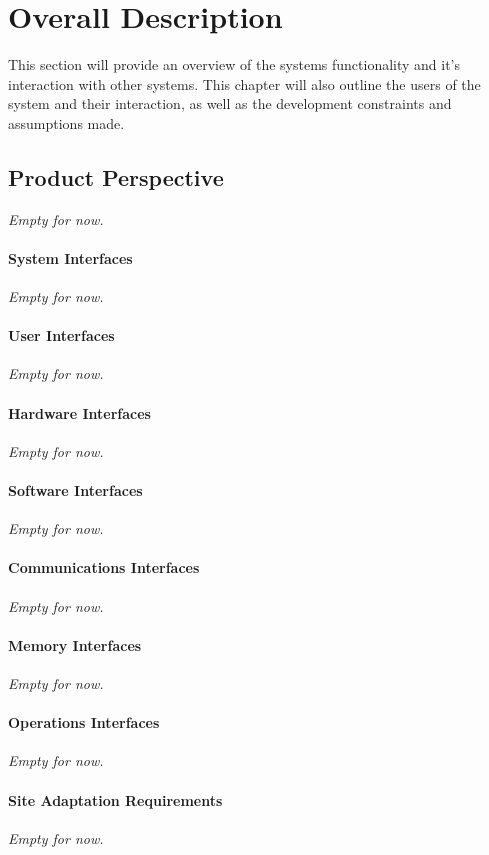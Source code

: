 \section{Overall Description}
	This section will provide an overview of the systems functionality and it's interaction with other systems. This chapter will also outline the users of the system and their interaction, as well as the development constraints and assumptions made.
	\subsection{Product Perspective}
	\textit{Empty for now.}

	\paragraph{System Interfaces}
	\textit{Empty for now.}
	\paragraph{User Interfaces}
	\textit{Empty for now.}
	\paragraph{Hardware Interfaces}
	\textit{Empty for now.}
	\paragraph{Software Interfaces}
	\textit{Empty for now.}
	\paragraph{Communications Interfaces}
	\textit{Empty for now.}
	\paragraph{Memory Interfaces}
	\textit{Empty for now.}
	\paragraph{Operations Interfaces}
	\textit{Empty for now.}
	\paragraph{Site Adaptation Requirements}
	\textit{Empty for now.}
	
